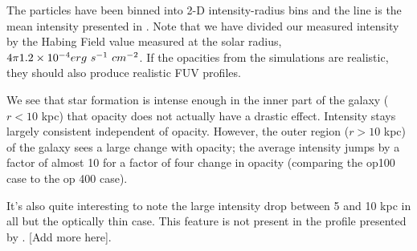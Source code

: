 The particles have been binned into 2-D intensity-radius bins and the line is the mean intensity presented in \citet{wolfireEt03}. Note that we have divided our measured intensity by the Habing Field value measured at the solar radius, $4\pi 1.2\times 10^{-4} erg~s^{-1}~cm^{-2}$. If the opacities from the simulations are realistic, they should also produce realistic FUV profiles.

We see that star formation is intense enough in the inner part of the galaxy ($r < 10$ kpc) that opacity does not actually have a drastic effect. Intensity stays largely consistent independent of opacity. However, the outer region ($r>10$ kpc) of the galaxy sees a large change with opacity; the average intensity jumps by a factor of almost 10 for a factor of four change in opacity (comparing the op100 case to the op 400 case).

It's also quite interesting to note the large intensity drop between 5 and 10 kpc in all but the optically thin case. This feature is not present in the profile presented by \citet{wolfireEt03}. [Add more here].

